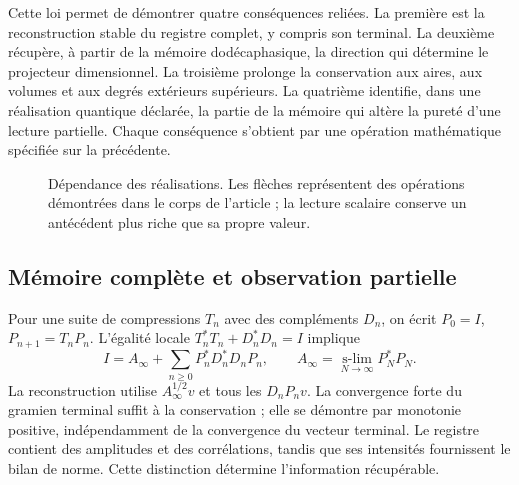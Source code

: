 Cette loi permet de démontrer quatre conséquences reliées. La première est la reconstruction stable du registre complet, y compris son terminal. La deuxième récupère, à partir de la mémoire dodécaphasique, la direction qui détermine le projecteur dimensionnel. La troisième prolonge la conservation aux aires, aux volumes et aux degrés extérieurs supérieurs. La quatrième identifie, dans une réalisation quantique déclarée, la partie de la mémoire qui altère la pureté d’une lecture partielle. Chaque conséquence s’obtient par une opération mathématique spécifiée sur la précédente.

\begin{figure}[htbp]
\centering
{}
\caption{Dépendance des réalisations. Les flèches représentent des opérations démontrées dans le corps de l’article ; la lecture scalaire conserve un antécédent plus riche que sa propre valeur.
}
\end{figure}

\subsection{Mémoire complète et observation partielle}
Pour une suite de compressions \(T_n\) avec des compléments \(D_n\), on écrit
\(P_0=I\), \(P_{n+1}=T_nP_n\). L’égalité locale
\(T_n^*T_n+D_n^*D_n=I\) implique
\[
I=A_\infty+\sum_{n\ge0}P_n^*D_n^*D_nP_n,
\qquad
A_\infty=\underset{N\to\infty}{\operatorname{s-lim}}P_N^*P_N.
\]
La reconstruction utilise \(A_\infty^{1/2}v\) et tous les \(D_nP_nv\). La convergence forte du gramien terminal suffit à la conservation ; elle se démontre par monotonie positive, indépendamment de la convergence du vecteur terminal. Le registre contient des amplitudes et des corrélations, tandis que ses intensités fournissent le bilan de norme. Cette distinction détermine l’information récupérable.


